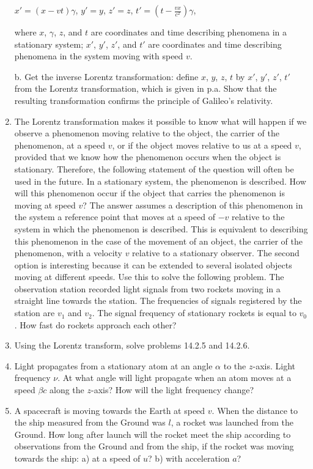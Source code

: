 \documentclass{article}
\begin{document}
\begin{enumerate}[label=14.2.\arabic*]
$x' = (x-vt)\gamma$, $y' = y$, $z' = z$, $t' = (t - \frac{vx}{c^2}) \gamma$, 

where $x$, $\gamma$, $z$, and $t$ are coordinates and time describing phenomena in a stationary system; $x'$, $y'$, $z'$, and $t'$ are coordinates and time describing phenomena in the system moving with speed $v$.

b. Get the inverse Lorentz transformation: define $x$, $y$, $z$, $t$ by $x'$, $y'$, $z'$, $t'$ from the Lorentz transformation, which is given in p.a. Show that the resulting transformation confirms the principle of Galileo's relativity.

\item The Lorentz transformation makes it possible to know what will happen if we observe a phenomenon moving relative to the object, the carrier of the phenomenon, at a speed $v$, or if the object moves relative to us at a speed $v$, provided that we know how the phenomenon occurs when the object is stationary. Therefore, the following statement of the question will often be used in the future. In a stationary system, the phenomenon is described. How will this phenomenon occur if the object that carries the phenomenon is moving at speed $v$? The answer assumes a description of this phenomenon in the system a reference point that moves at a speed of $-v$ relative to the system in which the phenomenon is described. This is equivalent to describing this phenomenon in the case of the movement of an object, the carrier of the phenomenon, with a velocity $v$ relative to a stationary observer. The second option is interesting because it can be extended to several isolated objects moving at different speeds. Use this to solve the following problem. The observation station recorded light signals from two rockets moving in a straight line towards the station. The frequencies of signals registered by the station are $v_1$ and $v_2$. The signal frequency of stationary rockets is equal to $v_0$. How fast do rockets approach each other?
\item Using the Lorentz transform, solve problems 14.2.5 and 14.2.6.

\item Light propagates from a stationary atom at an angle $\alpha$ to the $z$-axis. Light frequency $\nu$. At what angle will light propagate when an atom moves at a speed $\beta c$ along the $z$-axis? How will the light frequency change?

\item A spacecraft is moving towards the Earth at speed $v$. When the distance to the ship measured from the Ground was $l$, a rocket was launched from the Ground. How long after launch will the rocket meet the ship according to observations from the Ground and from the ship, if the rocket was moving towards the ship: a) at a speed of $u$? b) with acceleration $a$?


\end{enumerate}
\end{document}
